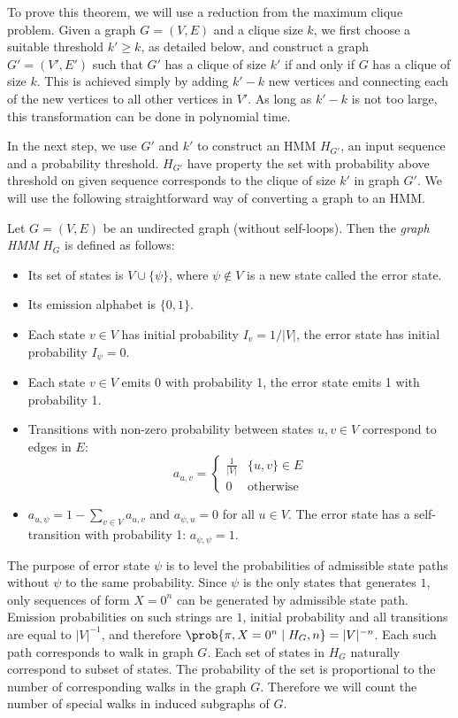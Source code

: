 To prove this theorem, we will use a reduction from the maximum clique
problem.  Given a graph $G=(V,E)$ and a clique
size $k$, we first choose a suitable threshold $k'\ge k$, as
detailed below, and construct a graph $G'=(V',E')$ such that $G'$ has
a clique of size $k'$ if and only if $G$ has a clique of size
$k$. This is achieved simply by adding $k'-k$ new vertices and
connecting each of the new vertices to all other vertices in $V'$.
As long as $k'-k$ is not too large, this transformation can be done in
polynomial time.

In the next step, we use $G'$ and $k'$ to construct an HMM $H_{G'}$, an input
sequence and a probability threshold. $H_{G'}$ have property the set with
probability above threshold on given sequence corresponds to the clique of size
$k'$ in graph $G'$. We will use the following
straightforward way of converting a graph to an HMM.

\begin{definition}\label{GraphHMM}
Let $G=(V,E)$ be an undirected graph (without self-loops). 
Then the \emph{graph HMM} $H_G$ is defined as follows:
\begin{itemize}
\item Its set of states is $V\cup \{\psi\}$, where $\psi\notin V$ is a
  new state called the error state.
\item Its emission alphabet is $\{0,1\}$.
\item Each state $v\in V$ has initial probability $I_{v} = 1/|V|$, the
error state has initial probability $I_{\psi}=0$.
\item Each state $v\in V$ emits 0 with probability 1, the error state emits 1 
with probability 1.
\item Transitions with non-zero probability between states $u,v\in V$
  correspond to edges in $E$:
$$a_{u,v}=\begin{cases}
\frac1{|V|} & \{u,v\}\in E\\
0 & \text{otherwise}
\end{cases}$$
\item $a_{u,\psi}=1-\sum_{v\in V}a_{u,v}$
and $a_{\psi,u}=0$ for all $u\in V$. The error state has a self-transition with
probability 1: $a_{\psi,\psi}=1$.
\end{itemize}
\end{definition}

The purpose of error state $\psi$ is to level the probabilities of admissible
state paths without $\psi$ to the same probability. Since $\psi$ is the only
states that generates $1$, only sequences of form $X=0^n$ can be generated by
admissible state path. Emission probabilities on such strings are $1$, initial
probability and all transitions are equal to $|V|^{-1}$, and therefore
$\prob{\pi, X=0^n\mid H_G,n} = |V|^{-n}$.  Each such path corresponds to walk in
graph $G$. Each set of states in $H_G$ naturally correspond to subset of states.
The probability of the set is proportional to the number of corresponding walks
in the graph $G$. Therefore we will count the number of special walks in induced
subgraphs of $G$.

